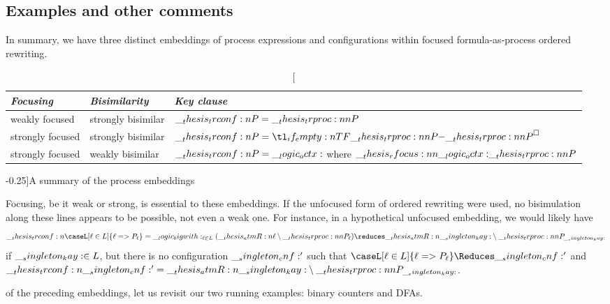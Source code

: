 


\subsection{Examples and other comments}\label{sec:correspond:embed:examples}


In summary, we have three distinct embeddings of process expressions and configurations within focused formula-as-process ordered rewriting.
\begin{table}[tbp]
  \centering
  \begin{tabular}{@{}lll@{}}
    \toprule
    \emph{Focusing} & \emph{Bisimilarity} & \emph{Key clause}
    \\ \midrule
    weakly focused & strongly bisimilar & $\trconf{P} = \trproc{P}$ \\
    strongly focused & strongly bisimilar & $\trconf{P} = \embed{\trproc{P}}$ \\
    strongly focused & weakly bisimilar & $\__thesis_trconf:n {P} = \__logic_octx:$ where $\rfocus{\octx}{\trproc{P}}$
    \\ \bottomrule
  \end{tabular}
  \caption[][-0.25\baselineskip]{A summary of the process embeddings}\label{tab:embedding-summary}
\end{table}
Focusing, be it weak or strong, is essential to these embeddings.
If the unfocused form of ordered rewriting were used, no bisimulation along these lines appears to be possible, not even a weak one.
For instance, in a hypothetical unfocused embedding, we would likely have 
\begin{equation*}
  \trconf{\caseL[\ell \in L]{\ell => P_{\ell}}}
    = {\textstyle \bigwith_{\ell \in L}(\atmR{\ell} \limp \trproc{P_{\ell}})}
    \reduces \atmR{\kay} \limp \trproc{P_{\kay}}
\end{equation*}
if $\__singleton_kay: \in L$, but there is no configuration $\__singleton_cnf:'$ such that $\caseL[\ell \in L]{\ell => P_{\ell}} \Reduces \cnf'$ and $\trconf{\cnf'} = \atmR{\kay} \limp \trproc{P_{\kay}}$.

 of the preceding embeddings, let us revisit our two running examples: binary counters and \acp{DFA}.

